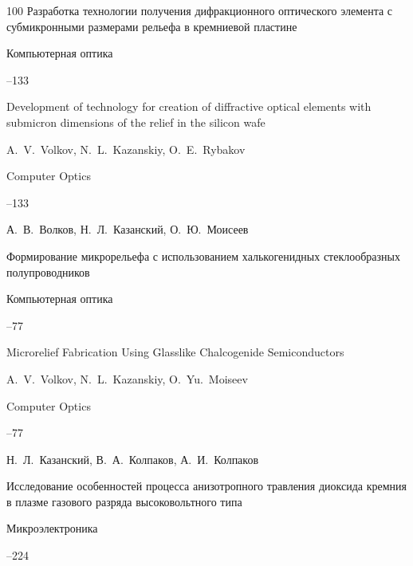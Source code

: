 \begin{thebibliography}{100}
\paper Разработка технологии получения дифракционного оптического элемента с субмикронными размерами рельефа в кремниевой пластине

\jour Компьютерная оптика



--133

\misctransl

\paper  Development of technology for creation of diffractive optical elements with submicron dimensions of the relief in the silicon wafe

\by A.~V.~Volkov, N.~L.~Kazanskiy, O.~E.~Rybakov 

\jour Computer Optics



--133




\by А.~В.~Волков, Н.~Л.~Казанский, О.~Ю.~Моисеев

\paper Формирование микрорельефа с использованием халькогенидных стеклообразных полупроводников

\jour Компьютерная оптика



--77

\misctransl

\paper Microrelief Fabrication Using Glasslike Chalcogenide Semiconductors 

\by A.~V.~Volkov, N.~L.~Kazanskiy, O.~Yu.~Moiseev

\jour Computer Optics



--77




\by  Н.~Л.~Казанский, В.~А.~Колпаков, А.~И.~Колпаков

\paper Исследование особенностей процесса анизотропного травления диоксида кремния в плазме газового разряда высоковольтного типа

\jour Микроэлектроника




--224


\end{thebibliography}
